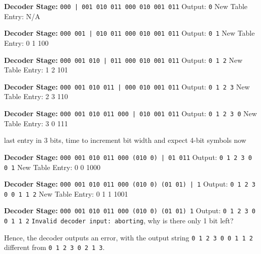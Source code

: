 \documentclass[12pt]{article}
\begin{document}
\textbf{Decoder Stage:} \texttt{000 | 001 010 011 000 010 001 011}
\newline Output: \texttt{0}
\newline New Table Entry: N/A

\textbf{Decoder Stage:} \texttt{000 001 | 010 011 000 010 001 011}
\newline Output: \texttt{0 1}
\newline New Table Entry: 0 1 \textrightarrow{} 100

\textbf{Decoder Stage:} \texttt{000 001 010 | 011 000 010 001 011}
\newline Output: \texttt{0 1 2}
\newline New Table Entry: 1 2 \textrightarrow{} 101

\textbf{Decoder Stage:} \texttt{000 001 010 011 | 000 010 001 011}
\newline Output: \texttt{0 1 2 3}
\newline New Table Entry: 2 3 \textrightarrow{} 110

\textbf{Decoder Stage:} \texttt{000 001 010 011 000 | 010 001 011}
\newline Output: \texttt{0 1 2 3 0}
\newline New Table Entry: 3 0 \textrightarrow{} 111

{\color{red} last entry in 3 bits, time to increment bit width and expect 4-bit symbols now}

\textbf{Decoder Stage:} \texttt{000 001 010 011 000 {\color{red}(010 0)} | 01 011}
\newline Output: \texttt{0 1 2 3 0 {\color{red}0 1}}
\newline New Table Entry: 0 0 \textrightarrow{} 1000

\textbf{Decoder Stage:} \texttt{000 001 010 011 000 (010 0) {\color{red}(01 01)} | 1}
\newline Output: \texttt{0 1 2 3 0 0 1 {\color{red}1 2}}
\newline New Table Entry: 0 1 1 \textrightarrow{} 1001

\textbf{Decoder Stage:} \texttt{000 001 010 011 000 (010 0) (01 01) {\color{red}1}}
\newline Output: \texttt{0 1 2 3 0 0 1 1 2}
\newline \texttt{Invalid decoder input: aborting}, why is there only 1 bit left?

Hence, the decoder outputs an error, with the output string \texttt{0 1 2 3 0 0 1 1 2} different from \texttt{0 1 2 3 0 2 1 3}.
\end{document}
